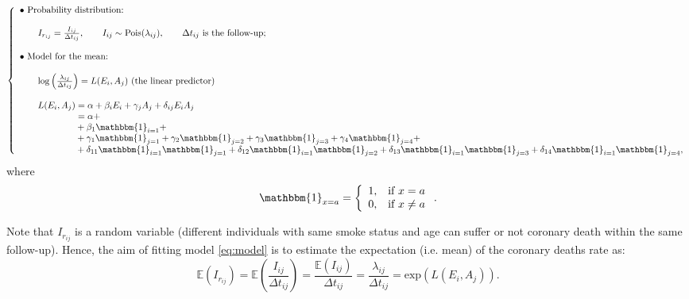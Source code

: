 \documentclass[10pt,a4paper,twoside]{article}\usepackage[]{graphicx}\usepackage[]{xcolor}
\begin{document}
\begin{equation}
\label{eq:model}
\left\{
\begin{array}{l}
\bullet\ \text{Probability distribution:} \\ \\
\qquad
I_{r_{ij}} = \frac{I_{ij}}{\Delta t_{ij}},
\qquad
I_{ij} \sim  \text{Pois}(\lambda_{ij}),
\qquad
\Delta t_{ij}\text{ is the follow-up;}\\ \\
\bullet\ \text{Model for the mean:} \\ \\
\qquad
\log
\left( \frac{\lambda_{ij}}{\Delta t_{ij}} \right) = L(E_i, A_j) \text{ (the linear predictor)}\\ \\
\qquad
L(E_i, A_j) = \alpha + \beta_i E_i + \gamma_j A_j + \delta_{ij} E_i A_j\\
\phantom{
\qquad
L(E_i, A_j)} = \alpha + \\
\phantom{
\qquad
L(E_i, A_j)} + \beta_1 \mathbbm{1}_{i=1} + \\
\phantom{
\qquad
L(E_i, A_j)
} + 
\gamma_1 \mathbbm{1}_{j=1} +
\gamma_2 \mathbbm{1}_{j=2} +
\gamma_3 \mathbbm{1}_{j=3} +
\gamma_4 \mathbbm{1}_{j=4} +\\
\phantom{
\qquad
L(E_i, A_j)
} + 
\delta_{11} \mathbbm{1}_{i=1}\mathbbm{1}_{j=1} +
\delta_{12} \mathbbm{1}_{i=1}\mathbbm{1}_{j=2} +
\delta_{13} \mathbbm{1}_{i=1}\mathbbm{1}_{j=3} +
\delta_{14} \mathbbm{1}_{i=1}\mathbbm{1}_{j=4},
\end{array}
\right.
\end{equation}
where
\begin{equation*}
\mathbbm{1}_{x=a}
=
\left\{
\begin{array}{ll}
1, & \text{if } x = a \\
0, & \text{if } x \neq a
\end{array}
\right..
\end{equation*}

Note that $I_{r_{ij}}$ is a random variable (different individuals with same smoke status and age can suffer or not coronary death within the same follow-up). Hence, the aim of fitting model \eqref{eq:model} is to estimate the expectation (i.e. mean) of the coronary deaths rate as:
\begin{equation*}
    \mathbb{E}(I_{r_{ij}}) =  \mathbb{E}\left(\frac{I_{ij}}{\Delta t_{ij}}\right) = \frac{\mathbb{E}(I_{ij})}{\Delta t_{ij}} = \frac{\lambda_{ij}}{\Delta t_{ij}} = \text{exp}(L(E_{i},A_{j})).
\end{equation*}
\end{document}
